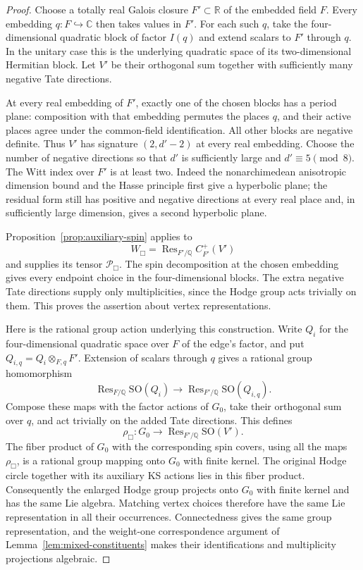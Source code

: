 \documentclass[11pt]{article}
\numberwithin{equation}{section}
\theoremstyle{definition}
\theoremstyle{remark}
\newcommand{\Q}{\mathbb Q}
\newcommand{\R}{\mathbb R}
\newcommand{\C}{\mathbb C}
\begin{document}
\begin{proof}
Choose a totally real Galois closure $F'\subset\R$ of the embedded
field $F$.  Every embedding $q:F\hookrightarrow\C$ then takes values
in $F'$.  For each such $q$, take the four-dimensional quadratic block
of factor $I(q)$ and extend scalars to $F'$ through $q$.
In the unitary case this is the underlying
quadratic space of its two-dimensional Hermitian block.  Let $V'$ be
their orthogonal sum together with sufficiently many negative Tate
directions.

At every real embedding of $F'$, exactly one of the chosen blocks
has a period plane: composition with that embedding permutes the
places $q$, and their active places agree under the common-field
identification.  All other blocks are negative definite.  Thus $V'$
has signature $(2,d'-2)$ at every real embedding.  Choose the number
of negative directions so that $d'$ is sufficiently large and
$d'\equiv5\pmod8$.  The Witt index over $F'$ is at least two.
Indeed the nonarchimedean anisotropic dimension bound and the
Hasse principle first give a hyperbolic plane; the residual form
still has positive and negative directions at every real place and,
in sufficiently large dimension, gives a second hyperbolic plane.

Proposition~\ref{prop:auxiliary-spin} applies to
\[
 W_{\Box}=\operatorname{Res}_{F'/\Q}C^+_{F'}(V')
\]
and supplies its tensor $\mathcal P_{\Box}$.  The spin decomposition
at the chosen embedding gives every endpoint choice in the
four-dimensional blocks.  The extra negative Tate directions supply
only multiplicities, since the Hodge group acts trivially on them.
This proves the assertion about vertex representations.

Here is the rational group action underlying this construction.
Write $Q_i$ for the four-dimensional quadratic space over $F$ of
the edge's factor, and put $Q_{i,q}=Q_i\otimes_{F,q}F'$.  Extension
of scalars through $q$ gives a rational group homomorphism
\[
 \operatorname{Res}_{F/\Q}\mathrm{SO}(Q_i)
 \longrightarrow
 \operatorname{Res}_{F'/\Q}\mathrm{SO}(Q_{i,q}).
\]
Compose these maps with the factor actions of $G_0$, take their
orthogonal sum over $q$, and act trivially on the added Tate
directions.  This defines
\[
 \rho_{\Box}:G_0\longrightarrow
       \operatorname{Res}_{F'/\Q}\mathrm{SO}(V').
\]
The fiber product of $G_0$ with the corresponding spin covers,
using all the maps $\rho_{\Box}$, is a rational group mapping
onto $G_0$ with finite kernel.  The original Hodge circle together
with its auxiliary KS actions lies in this fiber product.
Consequently the enlarged Hodge group projects onto $G_0$ with
finite kernel and has the same Lie algebra.  Matching vertex
choices therefore have the same Lie representation in all their
occurrences.  Connectedness gives the same group representation,
and the weight-one correspondence argument of
Lemma~\ref{lem:mixed-constituents} makes their identifications and
multiplicity projections algebraic.
\end{proof}
\end{document}
